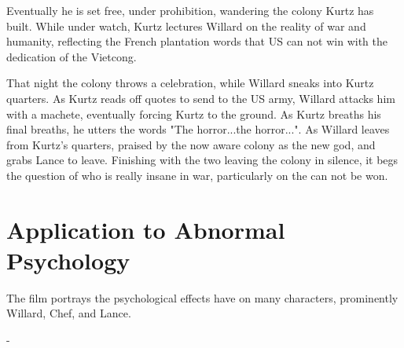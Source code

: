 \documentclass[a4paper,man,natbib]{apa6}
\begin{document}
Eventually he is set free, under prohibition, wandering the colony Kurtz has built. While under watch, Kurtz lectures Willard on the reality of war and humanity, reflecting the French plantation words that US can not win with the dedication of the Vietcong.

That night the colony throws a celebration, while Willard sneaks into Kurtz quarters. As Kurtz reads off quotes to send to the US army, Willard attacks him with a machete, eventually forcing Kurtz to the ground. As Kurtz breaths his final breaths, he utters the words "The horror...the horror...". As Willard leaves from Kurtz's quarters, praised by the now aware colony as the new god, and grabs Lance to leave. Finishing with the two leaving the colony  in silence, it begs the question of who is really insane in war, particularly on the can not be won.

\section{Application to Abnormal Psychology}

The film portrays the psychological effects have on many characters, prominently Willard, Chef, and Lance.

-
\end{document}
